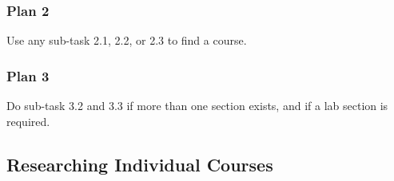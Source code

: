 \documentclass{article}
\begin{document}
\subsubsection{Plan 2}
    Use any sub-task 2.1, 2.2, or 2.3 to find a course.

\subsubsection{Plan 3}
    Do sub-task 3.2 and 3.3 if more than one section exists, and if a lab section is required.





\subsection{Researching Individual Courses}
\vspace{1ex}
\end{document}
